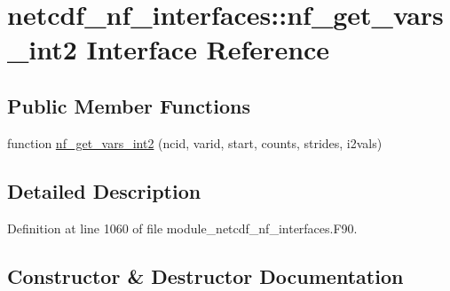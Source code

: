 \hypertarget{interfacenetcdf__nf__interfaces_1_1nf__get__vars__int2}{}\section{netcdf\+\_\+nf\+\_\+interfaces\+:\+:nf\+\_\+get\+\_\+vars\+\_\+int2 Interface Reference}
\label{interfacenetcdf__nf__interfaces_1_1nf__get__vars__int2}
\subsection*{Public Member Functions}
\begin{DoxyCompactItemize}
\item 
function \hyperlink{interfacenetcdf__nf__interfaces_1_1nf__get__vars__int2_aa1da4c822ed15048cb6ca088264b7f7f}{nf\+\_\+get\+\_\+vars\+\_\+int2} (ncid, varid, start, counts, strides, i2vals)
\end{DoxyCompactItemize}


\subsection{Detailed Description}


Definition at line 1060 of file module\+\_\+netcdf\+\_\+nf\+\_\+interfaces.\+F90.



\subsection{Constructor \& Destructor Documentation}
\mbox{\label{interfacenetcdf__nf__interfaces_1_1nf__get__vars__int2_aa1da4c822ed15048cb6ca088264b7f7f}} 

